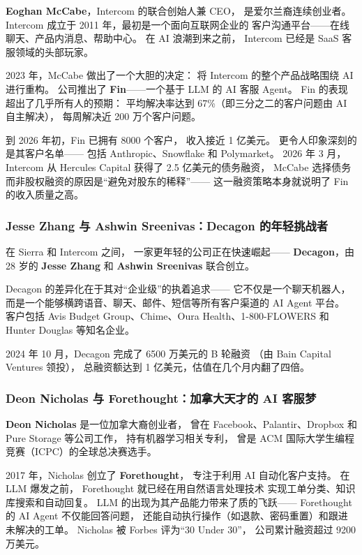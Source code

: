 \textbf{Eoghan McCabe}，Intercom 的联合创始人兼 CEO，
是爱尔兰裔连续创业者。
Intercom 成立于 2011 年，最初是一个面向互联网企业的
客户沟通平台——在线聊天、产品内消息、帮助中心。
在 AI 浪潮到来之前，
Intercom 已经是 SaaS 客服领域的头部玩家。

2023 年，McCabe 做出了一个大胆的决定：
将 Intercom 的整个产品战略围绕 AI 进行重构。
公司推出了 \textbf{Fin}——一个基于 LLM 的 AI 客服 Agent。
Fin 的表现超出了几乎所有人的预期：
平均解决率达到 67\%（即三分之二的客户问题由 AI 自主解决），
每周解决近 200 万个客户问题。

到 2026 年初，Fin 已拥有 8000 个客户，
收入接近 1 亿美元。
更令人印象深刻的是其客户名单——
包括 Anthropic、Snowflake 和 Polymarket。
2026 年 3 月，Intercom 从 Hercules Capital 获得了 2.5 亿美元的债务融资，
McCabe 选择债务而非股权融资的原因是``避免对股东的稀释''——
这一融资策略本身就说明了 Fin 的收入质量之高。

\subsubsection{Jesse Zhang 与 Ashwin Sreenivas：Decagon 的年轻挑战者}

在 Sierra 和 Intercom 之间，
一家更年轻的公司正在快速崛起——
\textbf{Decagon}，由 28 岁的 \textbf{Jesse Zhang}
和 \textbf{Ashwin Sreenivas} 联合创立。

Decagon 的差异化在于其对``企业级''的执着追求——
它不仅是一个聊天机器人，
而是一个能够横跨语音、聊天、邮件、短信等所有客户渠道的
AI Agent 平台。
客户包括 Avis Budget Group、Chime、Oura Health、1-800-FLOWERS 和 Hunter Douglas
等知名企业。

2024 年 10 月，Decagon 完成了 6500 万美元的 B 轮融资
（由 Bain Capital Ventures 领投），
总融资额达到 1 亿美元，估值在几个月内翻了四倍。

\subsubsection{Deon Nicholas 与 Forethought：加拿大天才的 AI 客服梦}

\textbf{Deon Nicholas} 是一位加拿大裔创业者，
曾在 Facebook、Palantir、Dropbox 和 Pure Storage 等公司工作，
持有机器学习相关专利，
曾是 ACM 国际大学生编程竞赛（ICPC）的全球总决赛选手。

2017 年，Nicholas 创立了 \textbf{Forethought}，
专注于利用 AI 自动化客户支持。
在 LLM 爆发之前，
Forethought 就已经在用自然语言处理技术
实现工单分类、知识库搜索和自动回复。
LLM 的出现为其产品能力带来了质的飞跃——
Forethought 的 AI Agent 不仅能回答问题，
还能自动执行操作（如退款、密码重置）和跟进未解决的工单。
Nicholas 被 Forbes 评为``30 Under 30''，
公司累计融资超过 9200 万美元。


